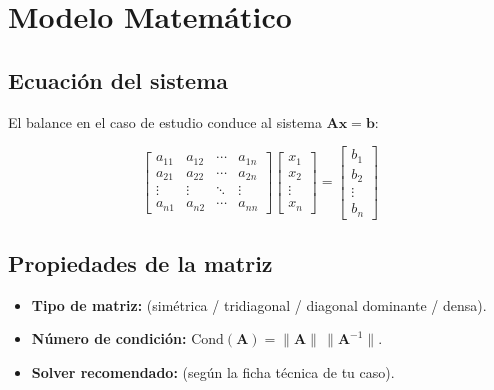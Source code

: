 \section{Modelo Matemático}
\label{sec:modelo}


\subsection{Ecuación del sistema}
El balance en el caso de estudio conduce al sistema $\mathbf{A}\mathbf{x}=\mathbf{b}$:

\begin{equation}
\begin{bmatrix}
a_{11} & a_{12} & \cdots & a_{1n} \\
a_{21} & a_{22} & \cdots & a_{2n} \\
\vdots & \vdots & \ddots & \vdots \\
a_{n1} & a_{n2} & \cdots & a_{nn}
\end{bmatrix}
\begin{bmatrix} x_1 \\ x_2 \\ \vdots \\ x_n \end{bmatrix}
=
\begin{bmatrix} b_1 \\ b_2 \\ \vdots \\ b_n \end{bmatrix}
\label{eq:matriz}
\end{equation}


\subsection{Propiedades de la matriz}
\begin{itemize}
	\item \textbf{Tipo de matriz:} (simétrica / tridiagonal / diagonal dominante / densa).
	\item \textbf{Número de condición:} $\mathrm{Cond}(\mathbf{A}) = \|\mathbf{A}\|\,\|\mathbf{A}^{-1}\|$.
	\item \textbf{Solver recomendado:} (según la ficha técnica de tu caso).
\end{itemize}
